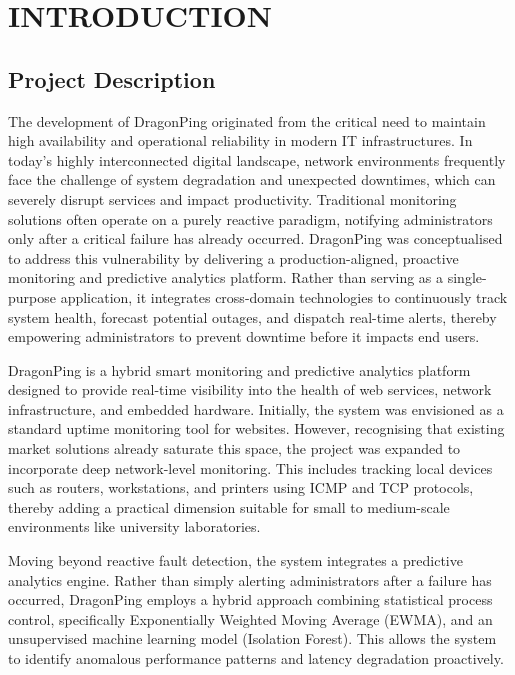 \documentclass[12pt,a4paper,oneside]{report}
\begin{document}
\chapter{INTRODUCTION}

\section{Project Description}
The development of DragonPing originated from the critical need to maintain high availability and operational reliability in modern IT infrastructures. In today's highly interconnected digital landscape, network environments frequently face the challenge of system degradation and unexpected downtimes, which can severely disrupt services and impact productivity. Traditional monitoring solutions often operate on a purely reactive paradigm, notifying administrators only after a critical failure has already occurred. DragonPing was conceptualised to address this vulnerability by delivering a production-aligned, proactive monitoring and predictive analytics platform. Rather than serving as a single-purpose application, it integrates cross-domain technologies to continuously track system health, forecast potential outages, and dispatch real-time alerts, thereby empowering administrators to prevent downtime before it impacts end users.

\noindent DragonPing is a hybrid smart monitoring and predictive analytics platform designed to provide real-time visibility into the health of web services, network infrastructure, and embedded hardware. Initially, the system was envisioned as a standard uptime monitoring tool for websites. However, recognising that existing market solutions already saturate this space, the project was expanded to incorporate deep network-level monitoring. This includes tracking local devices such as routers, workstations, and printers using ICMP and TCP protocols, thereby adding a practical dimension suitable for small to medium-scale environments like university laboratories.

\noindent Moving beyond reactive fault detection, the system integrates a predictive analytics engine. Rather than simply alerting administrators after a failure has occurred, DragonPing employs a hybrid approach combining statistical process control, specifically Exponentially Weighted Moving Average (EWMA), and an unsupervised machine learning model (Isolation Forest). This allows the system to identify anomalous performance patterns and latency degradation proactively. 
\end{document}
